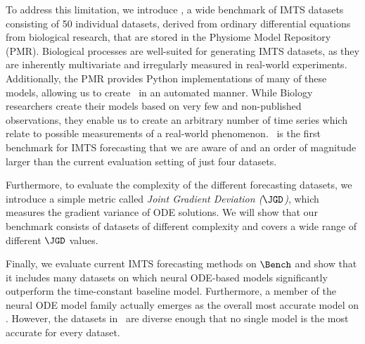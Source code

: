 To address this limitation, we introduce \Bench, a wide benchmark of IMTS
datasets consisting of 50 individual datasets, derived from ordinary
differential equations from biological research, that are stored in the Physiome Model Repository (PMR).
Biological processes are well-suited for generating IMTS datasets, as they are inherently multivariate and irregularly measured in real-world experiments.
Additionally, the PMR provides Python implementations of many of these models, allowing us to create \Bench~in an automated manner.
While Biology researchers create their models based on very few and non-published observations,
they enable us to create an arbitrary number of time series which relate to possible measurements of a real-world phenomenon. 
\Bench~is the first benchmark for IMTS forecasting that we are aware of and an order of magnitude larger
than the current evaluation setting of just four datasets. 

Furthermore, to evaluate the complexity of the different forecasting datasets,
we introduce a simple metric called \emph{Joint Gradient Deviation ($\JGD$)}, which
measures the gradient variance of ODE solutions. We will show that
our benchmark consists of datasets of different complexity and covers a wide
range of different \emph{$\JGD$} values.

Finally, we evaluate current IMTS forecasting methods on $\Bench$ and
show that it includes many datasets on which neural ODE-based models significantly outperform
the time-constant baseline model. Furthermore, a member of the neural ODE
model family actually emerges as the overall most accurate model on \Bench.
However, the datasets in \Bench~are diverse enough that no single model is the most accurate for every dataset.

